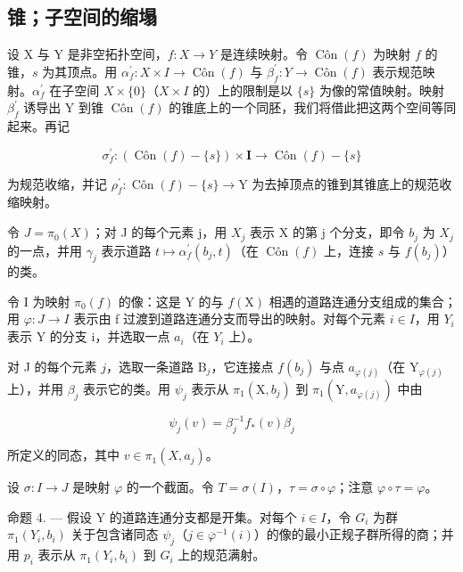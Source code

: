 \subsection{锥；子空间的缩塌}

设 X 与 Y 是非空拓扑空间，\(f: X \to Y\) 是连续映射。令 \(\operatorname{Côn}(f)\) 为映射 \(f\) 的锥，\(s\) 为其顶点。用 \(\alpha_{f}^{\prime}: X \times I \to \operatorname{Côn}(f)\) 与 \(\beta_{f}^{\prime}: Y \to \operatorname{Côn}(f)\) 表示规范映射。\(\alpha_{f}^{\prime}\) 在子空间 \(X \times \{0\}\)（\(X \times I\) 的）上的限制是以 \(\{s\}\) 为像的常值映射。映射 \(\beta_{f}^{\prime}\) 诱导出 Y 到锥 \(\operatorname{Côn}(f)\) 的锥底上的一个同胚，我们将借此把这两个空间等同起来。再记

\[
\sigma_ {f} ^ {\prime} \colon (\operatorname{Côn} (f) - \{s \}) \times \mathbf {I} \to \operatorname{Côn} (f) - \{s \}
\]

为规范收缩，并记 \(\rho_{f}^{\prime}\colon\operatorname{Côn}(f) - \{s\}\to\mathrm{Y}\) 为去掉顶点的锥到其锥底上的规范收缩映射。

令 \(J = \pi_{0}(X)\)；对 J 的每个元素 j，用 \(X_{j}\) 表示 X 的第 j 个分支，即令 \(b_{j}\) 为 \(X_{j}\) 的一点，并用 \(\gamma_{j}\) 表示道路 \(t \mapsto \alpha_{f}^{\prime}(b_{j}, t)\)（在 \(\operatorname{Côn}(f)\) 上，连接 \(s\) 与 \(f(b_{j})\)）的类。

令 I 为映射 \(\pi_{0}(f)\) 的像：这是 Y 的与 \(f(\mathrm{X})\) 相遇的道路连通分支组成的集合；用 \(\varphi\colon J\to I\) 表示由 f 过渡到道路连通分支而导出的映射。对每个元素 \(i\in I\)，用 \(Y_{i}\) 表示 Y 的分支 i，并选取一点 \(a_{i}\)（在 \(Y_{i}\) 上）。

对 J 的每个元素 \(j\)，选取一条道路 \(\mathrm{B}_{j}\)，它连接点 \(f(b_{j})\) 与点 \(a_{\varphi(j)}\)（在 \(\mathrm{Y}_{\varphi(j)}\) 上），并用 \(\beta_{j}\) 表示它的类。用 \(\psi_{j}\) 表示从 \(\pi_{1}(\mathrm{X},b_{j})\) 到 \(\pi_{1}(\mathrm{Y},a_{\varphi(j)})\) 中由

\[
\psi_ {j} (v) = \beta_ {j} ^ {- 1} f _ {*} (v) \beta_ {j}
\]

所定义的同态，其中 \(v \in \pi_1(X, a_j)\)。

设 \(\sigma\colon I\to J\) 是映射 \(\varphi\) 的一个截面。令 \(T=\sigma(I)\)，\(\tau=\sigma\circ\varphi\)；注意 \(\varphi\circ\tau=\varphi\)。

命题 4. --- 假设 Y 的道路连通分支都是开集。对每个 \(i \in I\)，令 \(G_i\) 为群 \(\pi_1(Y_i, b_i)\) 关于包含诸同态 \(\psi_j\)（\(j \in \overline{\varphi}^{-1}(i)\)）的像的最小正规子群所得的商；并用 \(p_i\) 表示从 \(\pi_1(Y_i, b_i)\) 到 \(G_i\) 上的规范满射。

